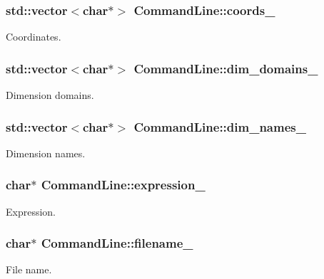 \subsubsection[{coords\+\_\+}]{\setlength{\rightskip}{0pt plus 5cm}std\+::vector$<$char$\ast$$>$ Command\+Line\+::coords\+\_\+}\label{classCommandLine_abe5adf7e0e46e33bbacab8def5146d54}
Coordinates. \hypertarget{classCommandLine_ab75e4302c09ff1ca0cc099374e914b93}{}
\subsubsection[{dim\+\_\+domains\+\_\+}]{\setlength{\rightskip}{0pt plus 5cm}std\+::vector$<$char$\ast$$>$ Command\+Line\+::dim\+\_\+domains\+\_\+}\label{classCommandLine_ab75e4302c09ff1ca0cc099374e914b93}
Dimension domains. \hypertarget{classCommandLine_a5d7aca6c2ef5530d8f53850b485d93d2}{}
\subsubsection[{dim\+\_\+names\+\_\+}]{\setlength{\rightskip}{0pt plus 5cm}std\+::vector$<$char$\ast$$>$ Command\+Line\+::dim\+\_\+names\+\_\+}\label{classCommandLine_a5d7aca6c2ef5530d8f53850b485d93d2}
Dimension names. \hypertarget{classCommandLine_a4503d0d4214e51a6884629b29e771ed7}{}
\subsubsection[{expression\+\_\+}]{\setlength{\rightskip}{0pt plus 5cm}char$\ast$ Command\+Line\+::expression\+\_\+}\label{classCommandLine_a4503d0d4214e51a6884629b29e771ed7}
Expression. \hypertarget{classCommandLine_aa4e002e557fc4b4974daa827a3883930}{}
\subsubsection[{filename\+\_\+}]{\setlength{\rightskip}{0pt plus 5cm}char$\ast$ Command\+Line\+::filename\+\_\+}\label{classCommandLine_aa4e002e557fc4b4974daa827a3883930}
File name. \hypertarget{classCommandLine_a584f279447430b2da687a3d5687c4d7e}{}
